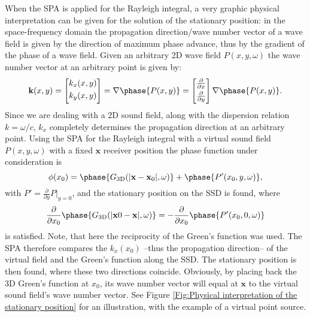 \documentclass[12pt,a4paper]{article}
\newcommand{\vx}{\mathbf{x}}
\newcommand{\vxo}{\mathbf{x}_0}
\begin{document}
When the SPA is applied for the Rayleigh integral, a very graphic physical interpretation can be given for the solution of the stationary position:
in the space-frequency domain the propagation direction/wave number vector of a wave field is given by the direction of maximum phase advance, thus by the gradient of the phase of a wave field. Given an arbitrary 2D wave field $P(x,y,\omega)$ the wave number vector at an arbitrary point is given by:
\begin{equation}
\mathbf{k}(x,y) = \begin{bmatrix} k_x(x,y) \\[0.3em] k_y(x,y)\\[0.3em]    \end{bmatrix} = \nabla \phase{P(x,y)} = \begin{bmatrix} \frac{\partial}{\partial x} \\[0.3em] \frac{\partial}{\partial y}\\[0.3em] \end{bmatrix}  \nabla \phase{P(x,y)}.
\end{equation}
Since we are dealing with a 2D sound field, along with the dispersion relation $k = \omega/c$, $k_x$ completely determines the propagation direction at an arbitrary point.
Using the SPA for the Rayleigh integral with a virtual sound field $P(x,y,\omega)$ with a fixed $\vx$ receiver position the phase function under consideration is 
\begin{equation}
\phi(x_0) =  \phase{G_{\mathrm{3D}}(|\vx-\vxo|,\omega)} + \phase{ P'(x_0,y,\omega)},
\end{equation}
with $P' =  \frac{\partial}{\partial y}P|_{y = 0} $,
and the stationary position on the SSD is found, where 
\begin{equation}
\frac{ \partial }{\partial x_0} \phase{G_{\mathrm{3D}}(|\vx0-\vx|,\omega)} = - \frac{ \partial }{\partial x_0} \phase{ P'(x_0,0,\omega) }
\end{equation}
is satisfied. Note, that here the reciprocity of the Green's function was used. The SPA therefore compares the $k_x(x_0)$ --thus the propagation direction-- of the virtual field and the Green's function along the SSD. The stationary position is then found, where these two directions coincide. Obviously, by placing back the 3D Green's function at $x_0$, its wave number vector will equal at $\vx$ to the virtual sound field's wave number vector. See Figure \ref{Fig:Physical interpretation of the stationary position} for an illustration, with the example of a virtual point source.
\end{document}
